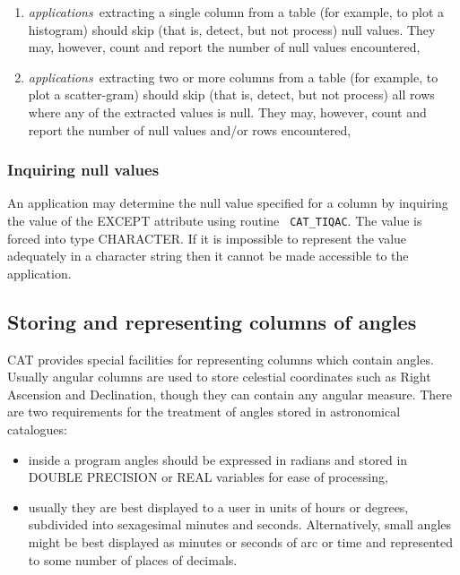 \begin{enumerate}

  \item {\it applications}\, extracting a single column from a table
   (for example, to plot a histogram) should skip (that is, detect, but
   not process) null values. They may, however, count and report the
   number of null values encountered,

  \item {\it applications}\, extracting two or more columns from a
   table (for example, to plot a scatter-gram) should skip (that is,
   detect, but not process) all rows where any of the extracted values
   is null. They may, however, count and report the number of null
   values and/or rows encountered,


\end{enumerate}

\subsubsection{Inquiring null values}

An application may determine the null value specified for a column by
inquiring the value of the EXCEPT attribute using routine {\tt
CAT\_TIQAC}. The value is forced into type CHARACTER. If it is
impossible to represent the value adequately in a character string then
it cannot be made accessible to the application.


\subsection{\label{ANGLES}Storing and representing columns of angles}

CAT provides special facilities for representing columns which
contain angles. Usually angular columns are used to store celestial
coordinates such as Right Ascension and Declination, though they can
contain any angular measure. There are two requirements for the treatment
of angles stored in astronomical catalogues:

\begin{itemize}

  \item inside a program angles should be expressed in radians
   and stored in DOUBLE PRECISION or REAL variables for ease of
   processing,

  \item usually they are best displayed to a user in units of hours
   or degrees, subdivided into sexagesimal minutes and seconds.
   Alternatively, small angles might be best displayed as minutes or
   seconds of arc or time and represented to some number of places of
   decimals.

\end{itemize}

